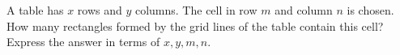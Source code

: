 A table has $x$ rows and $y$ columns. The cell in row $m$ and column $n$ is chosen. How many rectangles formed by the grid lines of the table contain this cell? Express the answer in terms of $x,y,m,n$.
